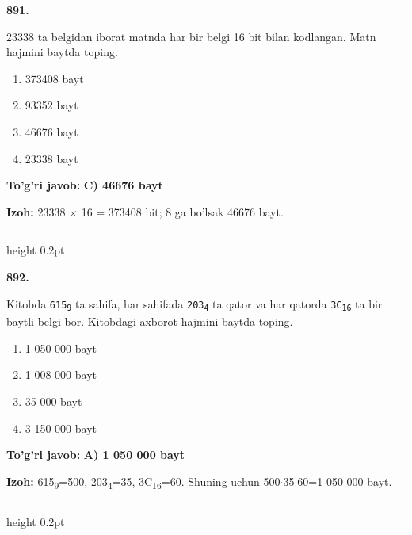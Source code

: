 \documentclass[10pt,a4paper,oneside]{article}
\begin{document}
\noindent\textbf{\color{ink}891.}
\par
23338 ta belgidan iborat matnda har bir belgi 16 bit bilan kodlangan. Matn hajmini baytda toping.
\begin{enumerate}[label=\Alph*),leftmargin=9mm]
\item 373408 bayt
\item 93352 bayt
\item 46676 bayt
\item 23338 bayt
\end{enumerate}
\begin{tcolorbox}[enhanced,breakable,colback=teal!4,colframe=teal!50!black,boxrule=0.5pt,arc=1.1mm,left=3mm,right=3mm,top=1.7mm,bottom=1.7mm,before skip=2mm,after skip=2mm]
\textbf{\color{teal}To'g'ri javob:} \textbf{C) 46676 bayt}
\par\smallskip
\textbf{Izoh:} 23338 \ensuremath{\times} 16 = 373408 bit; 8 ga bo'lsak 46676 bayt.
\end{tcolorbox}
\vspace{2mm}\hrule height 0.2pt \vspace{3mm}

\noindent\textbf{\color{ink}892.}
\par
Kitobda \texttt{615\textsubscript{9}} ta sahifa, har sahifada \texttt{203\textsubscript{4}} ta qator va har qatorda \texttt{3C\textsubscript{1}\textsubscript{6}} ta bir baytli belgi bor. Kitobdagi axborot hajmini baytda toping.
\begin{enumerate}[label=\Alph*),leftmargin=9mm]
\item 1 050 000 bayt
\item 1 008 000 bayt
\item 35 000 bayt
\item 3 150 000 bayt
\end{enumerate}
\begin{tcolorbox}[enhanced,breakable,colback=teal!4,colframe=teal!50!black,boxrule=0.5pt,arc=1.1mm,left=3mm,right=3mm,top=1.7mm,bottom=1.7mm,before skip=2mm,after skip=2mm]
\textbf{\color{teal}To'g'ri javob:} \textbf{A) 1 050 000 bayt}
\par\smallskip
\textbf{Izoh:} 615\textsubscript{9}=500, 203\textsubscript{4}=35, 3C\textsubscript{1}\textsubscript{6}=60. Shuning uchun 500\ensuremath{\cdot}35\ensuremath{\cdot}60=1 050 000 bayt.
\end{tcolorbox}
\vspace{2mm}\hrule height 0.2pt \vspace{3mm}
\end{document}
